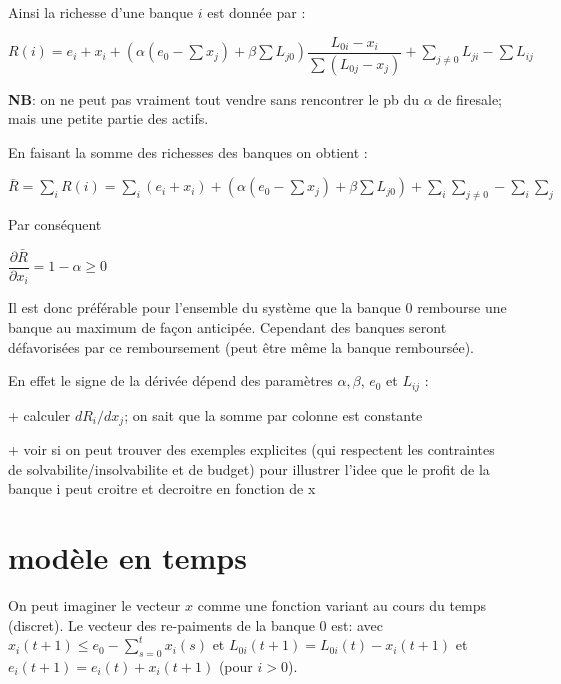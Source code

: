 \documentclass[11pt,oneside,twocolumn]{article}
\begin{document}
Ainsi la richesse d'une banque $i$ est donnée par :

$R(i)= e_i + x_i + (\alpha (e_0 - \sum x_j) + \beta \sum L_{j0}) \dfrac{L_{0i}- x_i}{\sum (L_{0j} - x_j)} + \sum_{j \neq 0} L_{ji} - \sum L_{ij}$

\textbf{NB}: on ne peut pas vraiment tout vendre sans rencontrer le pb du $\alpha$ de firesale; mais une petite partie des actifs.

En faisant la somme des richesses des banques on obtient :

$\bar R = \sum_i R(i) = \sum_i (e_i + x_i) +  (\alpha (e_0 - \sum x_j) + \beta \sum L_{j0}) + \sum_i \sum_{j \neq 0} - \sum_i \sum_j$

Par conséquent

$\dfrac{\partial \bar R}{\partial x_i} = 1 - \alpha\geq0$

Il est donc préférable pour l'ensemble du système que la banque $0$ rembourse une banque au maximum de façon anticipée. Cependant des banques seront défavorisées par ce remboursement (peut être même la banque remboursée).

En effet le signe de la dérivée dépend des paramètres $\alpha, \beta$, $e_0$ et $L_{ij}$ :

+ calculer $dR_i/dx_j$; on sait que la somme par colonne est constante

+ voir si on peut trouver des exemples explicites (qui respectent les contraintes de solvabilite/insolvabilite
et de budget) pour illustrer l'idee que le profit de la banque i peut croitre et decroitre en fonction de x

\section{modèle en temps}
On peut imaginer le vecteur $x$ comme une fonction variant au cours du temps (discret). Le vecteur des re-paiments de la banque 0 est:
avec
$x_i(t+1) \leq e_0 - \sum_{s=0}^{t}x_i(s)$ et $L_{0i}(t+1)=L_{0i}(t) - x_i(t+1)$ et
$e_i(t+1) = e_i(t) +x_i(t+1)$ (pour $i>0$).
\end{document}
